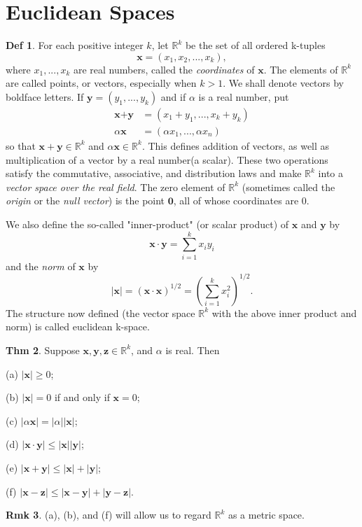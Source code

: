 \documentclass{article}
\theoremstyle{definition}
\newtheorem{definition}{Def}
\newtheorem{theorem}[definition]{Thm}
\newtheorem{remarks}[definition]{Rmk}
\begin{document}
\section{Euclidean Spaces}
\begin{definition}
    For each positive integer $k$, let $\mathbb{R}^k$ be the set of all ordered k-tuples 
    \[
    \textbf{x} = (x_1, x_2, ..., x_k),
    \]
    where $x_1,...,x_k$ are real numbers, called the \textit{coordinates} of $\textbf{x}$. The elements of $\mathbb{R}^k$ are called points, or vectors, especially when $k > 1$. We shall denote vectors by boldface letters. If $\textbf{y}=(y_1,...,y_k)$ and if $\alpha$ is a real number, put
    \[
    \begin{aligned}
        \textbf{x}+\textbf{y} &= (x_1+y_1,...,x_k+y_k)\\
        \alpha \textbf{x} &= (\alpha x_1,...,\alpha x_n)
    \end{aligned}
    \]
    so that $\textbf{x}+\textbf{y}\in\mathbb{R}^k$ and $\alpha\textbf{x}\in\mathbb{R}^k$. This defines addition of vectors, as well as multiplication of a vector by a real number(a scalar). These two operations satisfy the commutative, associative, and distribution laws and make $\mathbb{R}^k$ into a \textit{vector space over the real field}. The zero element of $\mathbb{R}^k$ (sometimes called the \textit{origin} or the \textit{null vector}) is the point $\textbf{0}$, all of whose coordinates are $0$.\par
    We also define the so-called "inner-product" (or scalar product) of $\textbf{x}$ and $\textbf{y}$ by
    \[
    \textbf{x}\cdot\textbf{y}=\sum_{i=1}^k x_i y_i
    \]
    and the \textit{norm} of $\textbf{x}$ by
    \[
    |\textbf{x}| = (\textbf{x}\cdot\textbf{x})^{1/2}=(\sum_{i=1}^k x_i^2)^{1/2}.
    \]
    The structure now defined (the vector space $\mathbb{R}^k$ with the above inner product and norm) is called euclidean k-space.
\end{definition}
\begin{theorem}
    Suppose $\textbf{x},\textbf{y},\textbf{z}\in\mathbb{R}^k$, and $\alpha$ is real. Then \par
    (a) $|\textbf{x}| \ge 0$;\par
    (b) $|\textbf{x}|=0$ if and only if $\textbf{x}=0$;\par
    (c) $|\alpha\textbf{x}|=|\alpha||\textbf{x}|$;\par
    (d) $|\textbf{x}\cdot\textbf{y}|\leq|\textbf{x}||\textbf{y}|$;\par
    (e) $|\textbf{x}+\textbf{y}|\leq|\textbf{x}|+|\textbf{y}|$;\par
    (f) $|\textbf{x}-\textbf{z}|\leq|\textbf{x}-\textbf{y}|+|\textbf{y}-\textbf{z}|$.
\end{theorem}
\begin{remarks}
    (a), (b), and (f) will allow us to regard $\mathbb{R}^k$ as a metric space.
\end{remarks}
\end{document}
